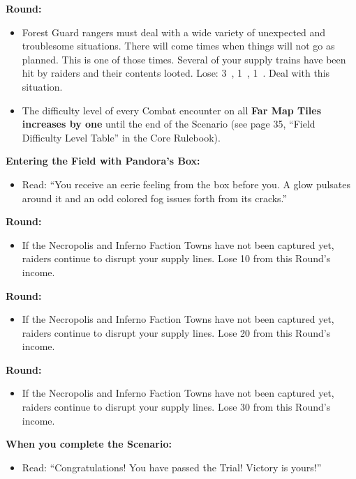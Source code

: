 \begin{multicols*}{2}
\textbf{ Round:}
\begin{itemize}
  \item Forest Guard rangers must deal with a wide variety of unexpected and troublesome situations.
    There will come times when things will not go as planned.
    This is one of those times.
    Several of your supply trains have been hit by raiders and their contents looted.
    Lose: 3~, 1~, 1~.
    Deal with this situation.
  \item The difficulty level of every Combat encounter on all \textbf{Far Map Tiles increases by one} until the end of the Scenario (see page 35, ``Field Difficulty Level Table'' in the Core Rulebook).  %
\end{itemize}

\textbf{Entering the Field with Pandora's Box:}
\begin{itemize}
  \item Read: ``You receive an eerie feeling from the box before you.
    A glow pulsates around it and an odd colored fog issues forth from its cracks.''
\end{itemize}

\textbf{ Round:}
\begin{itemize}
 \item If the Necropolis and Inferno Faction Towns have not been captured yet, raiders continue to disrupt your supply lines.
   Lose 10  from this Round's income.
\end{itemize}

\textbf{ Round:}
\begin{itemize}
  \item If the Necropolis and Inferno Faction Towns have not been captured yet, raiders continue to disrupt your supply lines.
    Lose 20  from this Round's income.
\end{itemize}

\textbf{ Round:}
\begin{itemize}
  \item If the Necropolis and Inferno Faction Towns have not been captured yet, raiders continue to disrupt your supply lines.
    Lose 30  from this Round's income.
\end{itemize}

\textbf{When you complete the Scenario:}
\begin{itemize}
  \item Read: ``Congratulations! You have passed the Trial! Victory is yours!''
\end{itemize}



\end{multicols*}
